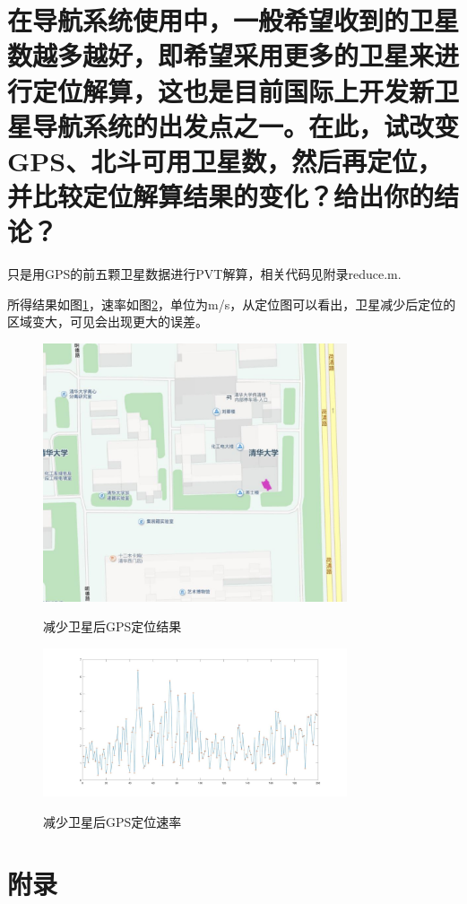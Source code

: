 \section{	在导航系统使用中，一般希望收到的卫星数越多越好，即希望采用更多的卫星来进行定位解算，这也是目前国际上开发新卫星导航系统的出发点之一。在此，试改变GPS、北斗可用卫星数，然后再定位，并比较定位解算结果的变化？给出你的结论？}
只是用GPS的前五颗卫星数据进行PVT解算，相关代码见附录reduce.m.

所得结果如图\ref{reduce}，速率如图\ref{v_reduce}，单位为m/s，从定位图可以看出，卫星减少后定位的区域变大，可见会出现更大的误差。
\begin{figure}
    \centering
    \includegraphics[width=0.8\textwidth]{pic/reduce.jpg}\\
    \caption{减少卫星后GPS定位结果}
    \label{reduce}
\end{figure}
\begin{figure}
    \centering
    \includegraphics[width=0.8\textwidth]{pic/v_reduce.jpg}\\
    \caption{减少卫星后GPS定位速率}
    \label{v_reduce}
\end{figure}
\section{附录}




